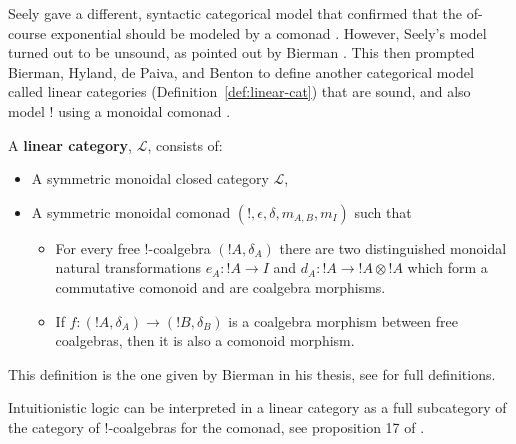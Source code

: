 Seely gave a different, syntactic categorical model that confirmed
that the of-course exponential should be modeled by a comonad
\cite{Seely:1989}.  However, Seely's model turned out to be unsound,
as pointed out by Bierman \cite{Bierman:1994}.  This then prompted
Bierman, Hyland, de Paiva, and Benton to define another categorical
model called linear categories (Definition~\ref{def:linear-cat}) that
are sound, and also model $!$ using a monoidal comonad
\cite{Bierman:1994}.  
\begin{definition}
  \label{def:linear-cat}
  A \textbf{linear category}, $\mathcal{L}$, consists of:
  \begin{center}
    \begin{itemize}
    \item A symmetric monoidal closed category $\mathcal{L}$,
    \item A symmetric monoidal comonad $(!, \epsilon, \delta, m_{A,B},
      m_I)$ such that 
      \begin{itemize}
      \item For every free $!$-coalgebra $(!A,\delta_A)$ there are two
        distinguished monoidal natural transformations $e_A : !A \to
        I$ and $d_A : !A \to !A \otimes !A$ which form a commutative
        comonoid and are coalgebra morphisms.
      \item If $f : (!A,\delta_A) \to (!B,\delta_B)$ is a coalgebra
        morphism between free coalgebras, then it is also a comonoid
        morphism.
      \end{itemize}
    \end{itemize}
  \end{center}
  This definition is the one given by Bierman in his thesis, see
  \cite{Bierman:1994} for full definitions.
\end{definition}
\noindent
Intuitionistic logic can be interpreted in a linear category as a
full subcategory of the category of $!$-coalgebras for the comonad,
see proposition 17 of \cite{Bierman:1994}.

